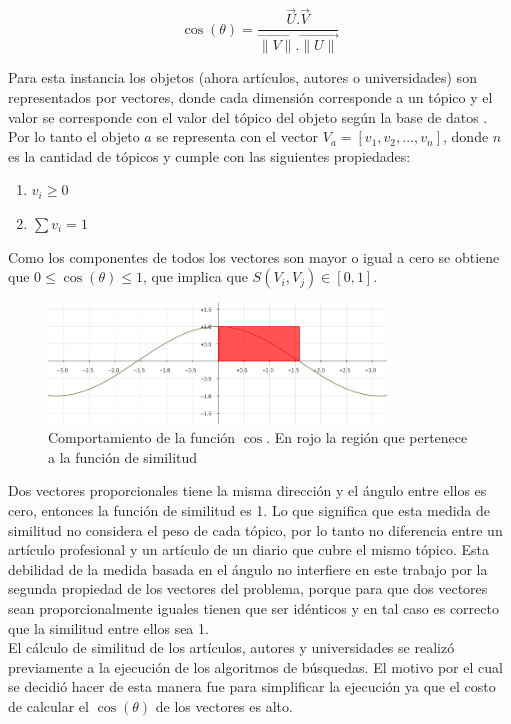 \begin{equation} \label{eq:angulovectorial}
\cos(\theta) =  \dfrac{\overrightarrow{U} . \overrightarrow{V}}{\overrightarrow{\lVert V\lVert}.\overrightarrow{\lVert U\lVert}}
\end{equation}

Para esta instancia los objetos (ahora artículos, autores o universidades) son representados por vectores, donde cada dimensión corresponde a un tópico y el valor se corresponde con el valor del tópico del objeto según la base de datos \cite{dataDrive}. Por lo tanto el objeto $a$ se representa con el vector $V_a = [v_1,v_2,...,v_n]$, donde $n$ es la cantidad de tópicos y cumple con las siguientes propiedades:
\begin{enumerate}
 \item $v_i \geq 0$
 \item $\sum{v_i} = 1$
\end{enumerate}

Como los componentes de todos los vectores son mayor o igual a cero se obtiene que $0\leq\cos(\theta)\leq1$, que implica que $S(V_i, V_j) \in \left[0, 1\right]$.\\

\begin{figure}[H]
\includegraphics[width=0.8\textwidth]{img/coseno.png}
\caption{Comportamiento de la función $\cos$. En rojo la región que pertenece a la función de similitud}
\label{bus:img-coseno}
\end{figure}

Dos vectores proporcionales tiene la misma dirección y el ángulo entre ellos es cero, entonces la función de similitud es 1. Lo que significa que esta medida de similitud no considera el peso de cada tópico, por lo tanto no diferencia entre un artículo profesional y un artículo de un diario que cubre el mismo tópico. Esta debilidad de la medida basada en el ángulo no interfiere en este trabajo por la segunda propiedad de los vectores del problema, porque para que dos vectores sean proporcionalmente iguales tienen que ser idénticos y en tal caso es correcto que la similitud entre ellos sea 1.\\
El cálculo de similitud de los artículos, autores y universidades se realizó previamente a la ejecución de los algoritmos de búsquedas. El motivo por el cual se decidió hacer de esta manera fue para simplificar la ejecución ya que el costo de calcular el $\cos(\theta)$ de los vectores es alto.
